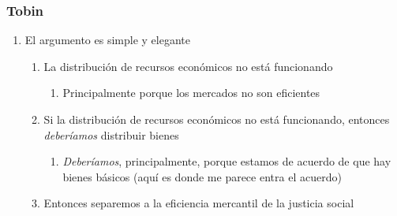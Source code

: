 \documentclass{beamer}
\begin{document}
\begin{frame}
\frametitle{Tobin}
    \begin{enumerate}
    \item El argumento es simple y elegante
        \begin{enumerate}
        \item La distribución de recursos económicos no está funcionando
            \begin{enumerate}
            \item Principalmente porque los mercados no son eficientes
            \end{enumerate}
    \item Si la distribución de recursos económicos no está funcionando, entonces \emph{deberíamos} distribuir bienes
        \begin{enumerate}
        \item \emph{Deberíamos}, principalmente, porque estamos de acuerdo de que hay bienes básicos (aquí es donde me parece entra el acuerdo)
        \end{enumerate}
  \item Entonces separemos a la eficiencia mercantil de la justicia social
  \end{enumerate}
  \end{enumerate}
\end{frame}





\end{document}
